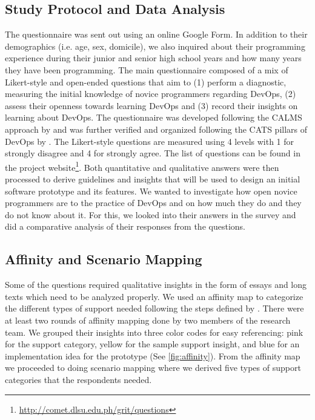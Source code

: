 \documentclass{sigchi}
\begin{document}
\subsection{Study Protocol and Data Analysis}
The questionnaire was sent out using an online Google Form. In addition to their demographics (i.e. age, sex, domicile), we also inquired about their programming experience during their junior and senior high school years and how many years they have been programming. The main questionnaire composed of a mix of Likert-style and open-ended questions that aim to (1) perform a diagnostic, measuring the initial knowledge of novice programmers regarding DevOps, (2) assess their openness towards learning DevOps and (3) record their insights on learning about DevOps. The questionnaire was developed following the CALMS approach by \cite{riley2014keep} and was further verified and organized following the CATS pillars of DevOps by \cite{davis2016effective}. The Likert-style questions are measured using 4 levels with 1 for strongly disagree and 4 for strongly agree. The list of questions can be found in the project website\footnote{\url{http://comet.dlsu.edu.ph/grit/questions}}. Both quantitative and qualitative answers were then processed to derive guidelines and insights that will be used to design an initial software prototype and its features. We wanted to investigate how open novice programmers are to the practice of DevOps and on how much they do and they do not know about it. For this, we looked into their answers in the survey and did a comparative analysis of their responses from the questions.

\subsection{Affinity and Scenario Mapping}
Some of the questions required qualitative insights in the form of essays and long texts which need to be analyzed properly. We used an affinity map to categorize the different types of support needed following the steps defined by \cite{holtzblatt2005rapid, beyer1999contextual}. There were at least two rounds of affinity mapping done by two members of the research team. We grouped their insights into three color codes for easy referencing: pink for the support category, yellow for the sample support insight, and blue for an implementation idea for the prototype (See \ref{fig:affinity}). From the affinity map we proceeded to doing scenario mapping where we derived five types of support categories that the respondents needed. 
\end{document}
